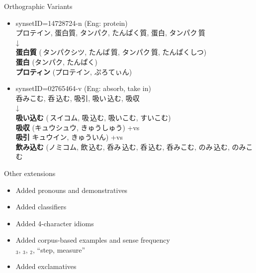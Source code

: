 \documentclass{beamer}
\begin{document}
\begin{frame}{Orthographic Variants}

  {\jafont
  \begin{itemize}
  \item synsetID=14728724-n (Eng: protein)
    \\ プロテイン, 蛋白質, タンパク, たんぱく質, 蛋白, タンパク\,質
    \\ \hspace{15em} ↓
    \\ \textbf{蛋白質} (\,タンパクシツ, たんぱ\,質, タンパク\,質, たんぱくしつ)
    \\ \textbf{蛋白} (タンパク, たんぱく)
    \\ \textbf{プロティン} (プロテイン, ぷろてぃん)
  \item synsetID=02765464-v (Eng: absorb, take in)
    \\ 呑みこむ, 呑\,込む, 吸引, 吸い\,込む, 吸収
    \\\hspace{20em} ↓
    \\ \textbf{吸い込む}  (\,スイコム, 吸\,込む, 吸いこむ, すいこむ)
    \\ \textbf{吸収} (キュウシュウ, きゅうしゅう) +vs
    \\ \textbf{吸引} キュウイン, きゅういん) +vs
    \\ \textbf{飲み{}込む} (ノミコム, 飲\,込む, 呑み\,込む, 呑\,込む, 呑みこむ, のみ\,込む, のみこむ
  \end{itemize}}
\end{frame}

\begin{frame}{Other extensions}
  \begin{itemize}
  \item Added pronouns and demonstratives
    \\ 
  \item Added classifiers
    \\ 
  \item Added 4-character idioms
    \\ 
  \item Added corpus-based examples and sense frequency
    \\ $_3$, $_3$, $_2$, 
    ``step, measure''
   \item Added exclamatives
    \\ 
  \end{itemize}
\end{frame}
\end{document}
